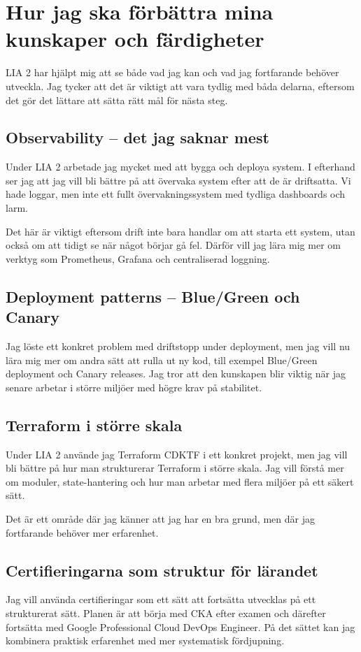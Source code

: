 \section{Hur jag ska förbättra mina kunskaper och färdigheter}
\label{sec:forbattra_kunskaper}

LIA 2 har hjälpt mig att se både vad jag kan och vad jag fortfarande behöver utveckla. Jag tycker
att det är viktigt att vara tydlig med båda delarna, eftersom det gör det lättare att sätta rätt mål
för nästa steg.

\subsection*{Observability -- det jag saknar mest}

Under LIA 2 arbetade jag mycket med att bygga och deploya system. I efterhand ser jag att jag
vill bli bättre på att övervaka system efter att de är driftsatta. Vi hade loggar, men inte ett
fullt övervakningssystem med tydliga dashboards och larm.

Det här är viktigt eftersom drift inte bara handlar om att starta ett system, utan också om att
tidigt se när något börjar gå fel. Därför vill jag lära mig mer om verktyg som Prometheus,
Grafana och centraliserad loggning.

\subsection*{Deployment patterns -- Blue/Green och Canary}

Jag löste ett konkret problem med driftstopp under deployment, men jag vill nu lära mig mer om
andra sätt att rulla ut ny kod, till exempel Blue/Green deployment och Canary releases. Jag
tror att den kunskapen blir viktig när jag senare arbetar i större miljöer med högre krav på
stabilitet.

\subsection*{Terraform i större skala}

Under LIA 2 använde jag Terraform CDKTF i ett konkret projekt, men jag vill bli bättre på hur
man strukturerar Terraform i större skala. Jag vill förstå mer om moduler, state-hantering och
hur man arbetar med flera miljöer på ett säkert sätt.

Det är ett område där jag känner att jag har en bra grund, men där jag fortfarande behöver mer
erfarenhet.

\subsection*{Certifieringarna som struktur för lärandet}

Jag vill använda certifieringar som ett sätt att fortsätta utvecklas på ett strukturerat sätt.
Planen är att börja med CKA efter examen och därefter fortsätta med Google Professional Cloud
DevOps Engineer. På det sättet kan jag kombinera praktisk erfarenhet med mer systematisk
fördjupning.